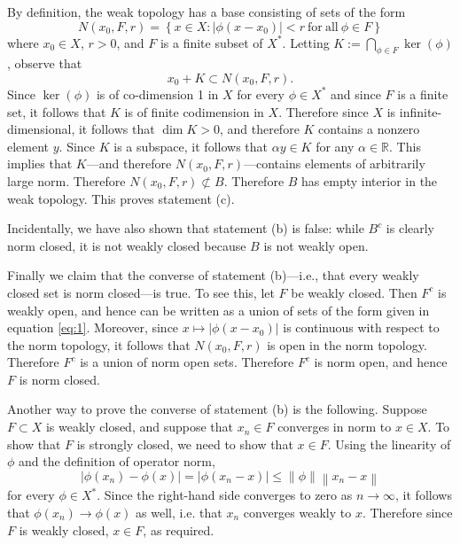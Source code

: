 \documentclass{exam}
\theoremstyle{problemstyle}
\newcommand{\norm}[1]{\left\lVert#1\right\rVert} %
\newcommand{\1}[1]{\textbf{1}_{\left[#1\right]}} %
\def\R{\mathbb{R}} %
\begin{document}
\begin{questions}
\begin{solution}
      By definition, the weak topology has a base consisting of sets of the form
    \begin{equation}\label{eq:1}
      N(x_{0},F,r)=\left\{ x\in X : |\phi(x-x_{0})|<r \mathrm{\ for\ all\ }\phi\in F\right\}
    \end{equation}
    where $x_{0}\in X$, $r>0$, and $F$ is a finite subset of $X^{*}$. Letting $K:= \bigcap_{\phi \in F} \ker(\phi)$, observe that
    \begin{equation*}
      x_{0}+ K \subset N(x_{0},F,r).
    \end{equation*}
    Since $\ker(\phi)$ is of co-dimension 1 in $X$ for every $\phi\in X^{*}$ and since $F$ is a finite set, it follows that $K$ is of finite codimension in $X$. Therefore since $X$ is infinite-dimensional, it follows that $\dim K >0$, and therefore $K$ contains a nonzero element $y$. Since $K$ is a subspace, it follows that $\alpha y\in K$ for any $\alpha\in \R$. This implies that $K$---and therefore $N(x_{0},F,r)$---contains elements of arbitrarily large norm. Therefore $N(x_{0},F,r)\not\subset B$. Therefore $B$ has empty interior in the weak topology. This proves statement (c).

    Incidentally, we have also shown that statement (b) is false: while $B^c$ is clearly norm closed, it is not weakly closed because $B$ is not weakly open.

    Finally we claim that the converse of statement (b)---i.e., that every weakly closed set is norm closed---is true. To see this, let $F$ be weakly closed. Then $F^c$ is weakly open, and hence can be written as a union of sets of the form given in equation \eqref{eq:1}. Moreover, since $x\mapsto |\phi(x-x_{0})|$ is continuous with respect to the norm topology, it follows that $N(x_{0},F,r)$ is open in the norm topology. Therefore $F^c$ is a union of norm open sets. Therefore $F^c$ is norm open, and hence $F$ is norm closed.

    Another way to prove the converse of statement (b) is the following. Suppose $F\subset X$ is weakly closed, and suppose that $x_{n}\in F$ converges in norm to $x\in X$. To show that $F$ is strongly closed, we need to show that $x\in F$. Using the linearity of $\phi$ and the definition of operator norm,
    \begin{equation*}
      |\phi(x_{n})-\phi(x)| = |\phi(x_{n}-x)|\leq \norm{\phi} \norm{x_{n}-x}
    \end{equation*}
    for every $\phi\in X^{*}$. Since the right-hand side converges to zero as $n\to\infty$, it follows that $\phi(x_{n})\to \phi(x)$ as well, i.e. that $x_{n}$ converges weakly to $x$. Therefore since $F$ is weakly closed, $x\in F$, as required.
\end{solution}



\end{questions}
\end{document}
